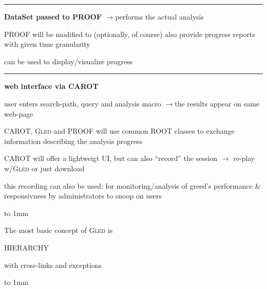 \documentclass[12pt]{article}
\def\nl{\newline}
\def\bl{\bigskip\hrule\bigskip}
\def\q{\quad}
\def\qtoq{\q$\to$\q}
\def\gled{\textsc{Gled}\xspace}
\def\root{\textsc{ROOT}\xspace}
\begin{document}
\bl

\textbf{DataSet passed to PROOF} \qtoq performs the actual analysis

PROOF will be modified to (optionally, of course) also provide
progress reports with given time granularity

can be used to display/visualize progress

\bl

\textbf{web interface via CAROT}

user enters search-path, query and analysis macro \qtoq the results
appear on same web-page
 
CAROT, \gled and PROOF will use common \root classes to exchange
information describing the analysis progress

CAROT will offer a lightweigt UI, but can also ``record'' the session \qtoq
re-play w/\gled or just download

this recording can also be used:\nl
for monitoring/analysis of greed's performance \& responsivness\nl
by administrators to snoop on users

\newpage

\Huge
\hbox to 1mm{}
\vfill

\centerline{The most basic concept of \gled is}

\vskip 1cm

\centerline{\color{dblue}HIERARCHY}

\vskip 1cm

\centerline{with cross-links and exceptions}

\vfill
\hbox to 1mm{}
\end{document}
